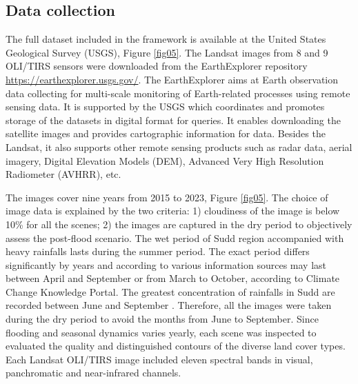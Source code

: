 \documentclass[analytics,article,submit,pdftex,moreauthors]{Definitions/mdpi}
\begin{document}
\subsection{Data collection}

The full dataset included in the framework is available at the United States Geological Survey (USGS), Figure \ref{fig05}. The Landsat images from 8 and 9 OLI/TIRS sensors were downloaded from the EarthExplorer repository \href{https://earthexplorer.usgs.gov/}{https://earthexplorer.usgs.gov/}. The EarthExplorer aims at Earth observation data collecting for multi-scale monitoring of Earth-related processes using remote sensing data. It is supported by the USGS which coordinates and promotes storage of the datasets in digital format for queries. It enables downloading the satellite images and provides cartographic information for data. Besides the Landsat, it also supports other remote sensing products such as radar data, aerial imagery, Digital Elevation Models (DEM), Advanced Very High Resolution Radiometer (AVHRR), etc.  

The images cover nine years from 2015 to 2023, Figure \ref{fig05}. The choice of image data is explained by the two criteria: 1) cloudiness of the image is below 10\% for all the scenes; 2) the images are captured in the dry period to objectively assess the post-flood scenario. The wet period of Sudd region accompanied with heavy rainfalls lasts during the summer period. The exact period differs significantly by years and according to various information sources may last between April and September \cite{MartinBurgess} or from March to October, according to Climate Change Knowledge Portal. The greatest concentration of rainfalls in Sudd are recorded between June and September \cite{Climatic}. Therefore, all the images were taken during the dry period to avoid the months from June to September. Since flooding and seasonal dynamics varies yearly, each scene was inspected to evaluated the quality and distinguished contours of the diverse land cover types. Each Landsat OLI/TIRS image included eleven spectral bands in visual, panchromatic and near-infrared channels. 
\end{document}
